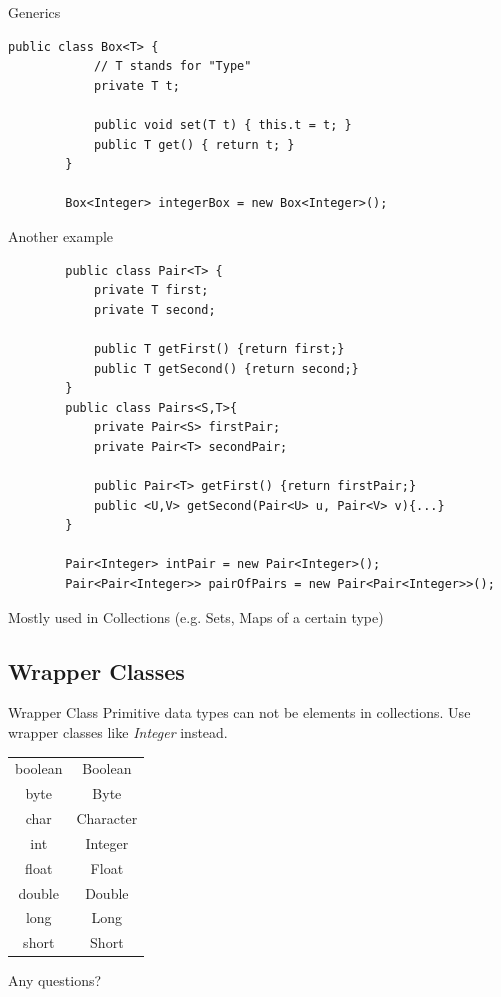 \begin{frame}[fragile]{Generics}
	\begin{lstlisting}[basicstyle=\ttfamily\scriptsize]
		public class Box<T> {
		    // T stands for "Type"
		    private T t;

		    public void set(T t) { this.t = t; }
		    public T get() { return t; }
		}
		
		Box<Integer> integerBox = new Box<Integer>();

	\end{lstlisting}
\end{frame}

\begin{frame}[fragile]{Another example}
	\begin{lstlisting}
		public class Pair<T> {
			private T first;
			private T second;
			
			public T getFirst() {return first;}
			public T getSecond() {return second;}
		}
		public class Pairs<S,T>{
			private Pair<S> firstPair;
			private Pair<T> secondPair;
			
			public Pair<T> getFirst() {return firstPair;}
			public <U,V> getSecond(Pair<U> u, Pair<V> v){...}
		}
		
		Pair<Integer> intPair = new Pair<Integer>();
		Pair<Pair<Integer>> pairOfPairs = new Pair<Pair<Integer>>();
	\end{lstlisting}
	Mostly used in Collections (e.g. Sets, Maps of a certain type)
\end{frame}


\subsection{Wrapper Classes}

\begin{frame}{Wrapper Class}
	Primitive data types can not be elements in collections. 
	Use wrapper classes like \emph{Integer} instead.
	\begin{center}
		\begin{tabular}{ c  c }
			boolean & Boolean \\
			byte & Byte \\
			char & Character \\
			int & Integer \\
			float & Float \\
			double & Double \\
			long & Long \\
			short & Short
		\end{tabular}
	\end{center}
	\pause
	\huge Any questions?
\end{frame}

